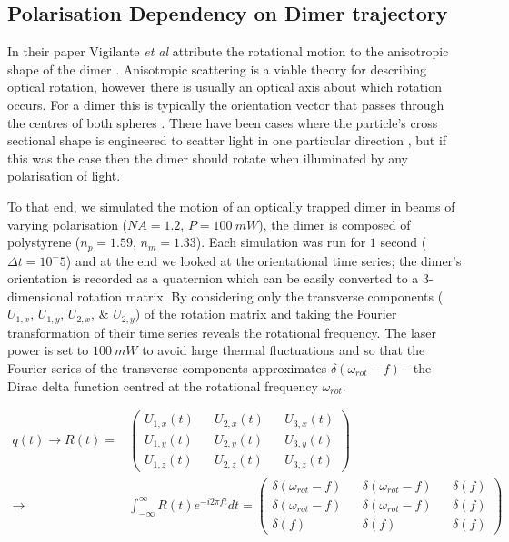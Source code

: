 \subsection{Polarisation Dependency on Dimer trajectory}
\label{sec:rot_pol}
In their paper Vigilante \textit{et al} attribute the rotational motion 
to the anisotropic shape of the dimer \cite{Vigilante2020}. Anisotropic 
scattering is a viable theory for describing optical rotation, however
there is usually an optical axis about which rotation occurs. For a dimer
this is typically the orientation vector that passes through the centres 
of both spheres \cite{Ahn2018, Reimann2018, Bruce2020}. There have been 
cases where the particle's cross sectional shape is engineered to scatter
light in one particular direction \cite{Higurashi1994}, but if this was
the case then the dimer should rotate when illuminated by any polarisation
of light. 

To that end, we simulated the motion of an optically trapped dimer in 
beams of varying polarisation ($NA=1.2$, $P=100\ mW$), the dimer is 
composed of polystyrene ($n_p=1.59$, $n_m=1.33$). Each simulation was 
run for $1$ second ($\Delta t =10^-5$) and at the end we looked at the 
orientational time series; the dimer's orientation is recorded as a 
quaternion which can be easily converted to a 3-dimensional rotation 
matrix. By considering only the transverse components ($U_{1,x}$, 
$U_{1,y}$, $U_{2,x}$, \& $U_{2,y}$) of the rotation matrix and taking 
the Fourier transformation of their time series reveals the rotational 
frequency. The laser power is set to $100\ mW$ to avoid large thermal 
fluctuations and so that the Fourier series of the transverse components 
approximates $\delta(\omega_{rot}-f)$ - the Dirac delta function centred 
at the rotational frequency $\omega_{rot}$.

\begin{equation}
	\begin{split}
		q(t) \rightarrow R(t) =& 
		\begin{pmatrix}
			U_{1,x}(t) && U_{2,x}(t) && U_{3,x}(t) \\
			U_{1,y}(t) && U_{2,y}(t) && U_{3,y}(t) \\
			U_{1,z}(t) && U_{2,z}(t) && U_{3,z}(t) 
		\end{pmatrix} \\
		\rightarrow
		&\int^\infty_{-\infty}R(t)e^{-i2\pi ft} dt = 
		\begin{pmatrix}
			\delta(\omega_{rot}-f) && \delta(\omega_{rot}-f) && \delta(f) \\
			\delta(\omega_{rot}-f) && \delta(\omega_{rot}-f) && \delta(f)\\
			\delta(f) && \delta(f) && \delta(f)
		\end{pmatrix}
	\end{split}
\end{equation}


